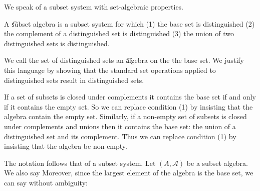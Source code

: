 
\sbasic

























\sstart
{}


We speak of a subset system with set-algebraic properties.


A \t{subset algebra}
is a subset system for which
(1) the base set is distinguished
(2) the complement of a distinguished
set is distinguished
(3) the union of two distinguished sets
is distinguished.

We call the set of distinguished sets
an \t{algebra} on the the base set.
We justify this
language by showing that the standard set
operations applied to distinguished sets
result in distinguished sets.

If a set of subsets is closed under complements
it contains the base set
if and only if
it contains the empty set.
So we can replace condition (1) by insisting
that the algebra contain the empty set.
Similarly, if a non-empty set of subsets
is closed under complements and unions
then it contains the base set: the union
of a distinguished set and its complement.
Thus we can replace condition (1) by insisting
that the algebra be non-empty.


The notation follows that of a subset system.
Let $(A, \mathcal{A})$ be a subset algebra.
We also say 
Moreover, since the largest element of the
algebra is the base set, we can say without
ambiguity: 


